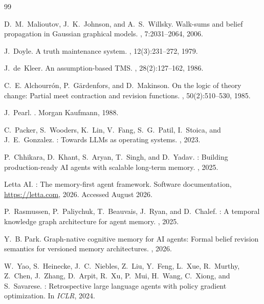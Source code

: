 \documentclass{article}
\theoremstyle{definition}
\begin{document}
\clearpage
{\small
\begin{thebibliography}{99}

D.~M.~Malioutov, J.~K.~Johnson, and A.~S.~Willsky.
\newblock Walk-sums and belief propagation in {Gaussian} graphical
  models.
, 7:2031--2064,
  2006.

J.~Doyle.
\newblock A truth maintenance system.
, 12(3):231--272, 1979.

J.~de~Kleer.
\newblock An assumption-based {TMS}.
, 28(2):127--162, 1986.

C.~E. Alchourr\'{o}n, P.~G\"{a}rdenfors, and D.~Makinson.
\newblock On the logic of theory change: Partial meet contraction and
  revision functions.
, 50(2):510--530, 1985.

J.~Pearl.
.
\newblock Morgan Kaufmann, 1988.

C.~Packer, S.~Wooders, K.~Lin, V.~Fang, S.~G.~Patil, I.~Stoica, and
  J.~E.~Gonzalez.
: Towards {LLMs} as operating systems.
, 2023.

P.~Chhikara, D.~Khant, S.~Aryan, T.~Singh, and D.~Yadav.
: Building production-ready {AI} agents with scalable
  long-term memory.
, 2025.

Letta AI.
: The memory-first agent framework.
\newblock Software documentation, \url{https://letta.com}, 2026.
  Accessed August 2026.

P.~Rasmussen, P.~Paliychuk, T.~Beauvais, J.~Ryan, and D.~Chalef.
: A temporal knowledge graph architecture for agent
  memory.
, 2025.

Y.~B. Park.
\newblock Graph-native cognitive memory for {AI} agents: Formal belief
  revision semantics for versioned memory architectures.
, 2026.

W.~Yao, S.~Heinecke, J.~C.~Niebles, Z.~Liu, Y.~Feng, L.~Xue,
  R.~Murthy, Z.~Chen, J.~Zhang, D.~Arpit, R.~Xu, P.~Mui, H.~Wang,
  C.~Xiong, and S.~Savarese.
: Retrospective large language agents with
  policy gradient optimization.
\newblock In {\em ICLR}, 2024.


\end{thebibliography}}
\end{document}
